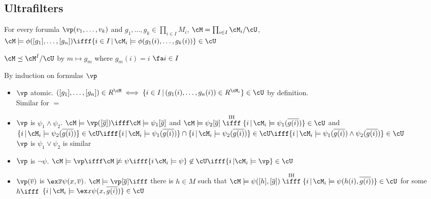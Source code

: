 
\subsection{Ultrafilters}

\begin{theorem}
    For every forumla $\vp(v_1, \ldots, v_k)$ and $g_1, \ldots, g_k \in \prod_{i \in I}M_i$, $\cM = \prod_{i \in I}\cM_i /\cU$, $\cM \models \phi([g_1], \ldots, [g_n]) \ifff \{ i \in I \, | \, \cM_i \models \phi(g_1(i), \ldots, g_k(i))\} \in \cU$ 
\end{theorem}

\begin{corollary}
    $\cM \preceq \cM^I/\cU$ by $ m \mapsto g_m$ where $g_m(i)=i$ $\fa i \in I$ 
\end{corollary}

\begin{pf}
    By induction on formulas $\vp$ 
    \begin{itemize}
        \item $\vp$ atomic. $([g_1], \ldots, [g_n]) \in R^{\cM} \iff \{i \in I \, | \, (g_1(i), \ldots, g_n(i)) \in R^{\cM_i}\} \in \cU$ by definition. \\
        Similar for $=$ 
        \item $\vp$ is $\psi_1 \wedge \psi_2$. $\cM \models \vp([\overline{g}]) \ifff \cM \models \psi_1[\overline{g}]$ and $\cM \models \psi_2[\overline{g}] \stackrel{\text{IH}}{\ifff} \{ i \, | \, \cM_i \models \psi_1(\overline{g(i)})\} \in \cU$ and $\{ i \, | \, \cM_i \models \psi_2(\overline{g(i)})\} \in \cU \ifff \{ i \, | \, \cM_i \models \psi_1(\overline{g(i)})\} \cap \{ i \, | \, \cM_i \models \psi_2(\overline{g(i)})\} \in \cU \ifff \{ i \, | \, \cM_i \models \psi_1(\overline{g(i)}) \wedge \psi_2(\overline{g(i)})\} \in \cU$ \\
        $\vp$ is $\psi_1 \vee \psi_2$ is similar 
        \item $\vp$ is $\neg \psi$. $\cM \models \vp \ifff \cM \not\models \psi \ifff \{ i \, \cM_i \models \psi\} \not\in \cU \ifff \{i \, | \cM_i \models \vp\} \in \cU$ 
        \item $\vp(\overline{v})$ is $\ex \overline{x} \psi(x, \overline{v})$. $\cM \models \vp[\overline{g}] \ifff $ there is $h \in M$ such that $\cM \models \psi([h], [\overline{g}]) \stackrel{\text{IH}}{\ifff} \{ i \, | \, \cM_i \models \psi(h(i), \overline{g(i)})\} \in \cU$ for some $h \ifff$ $\{ i \, | \, \cM_i \models \ex x \psi(x, \overline{g(i)})\} \in \cU$  
    \end{itemize}
\end{pf}

